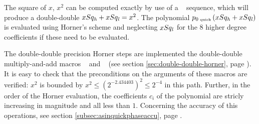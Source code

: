 The square of $x$, $x^2$ can be computed exactly by use of a \Mul~
sequence, which will produce a double-double $xSq_{\mathit{h}} + xSq_{\mathit{l}} =
x^2$. The polynomial $p_{0\mbox{\tiny ~quick}}\left( xSq_{\mathit{h}} + xSq_{\mathit{l}}
\right)$ is evaluated using Horner's scheme and neglecting $xSq_{\mathit{l}}$
for the $8$ higher degree coefficients if these need to be evaluated. 

The double-double precision Horner steps are implemented the
double-double multiply-and-add macros \MulAddDD~ and \MulAddDdD~ (see
section \ref{sec:double-double-horner}, page
\pageref{sec:double-double-horner}). It is easy to check that the
preconditions on the arguments of these macros are verified: $x^2$ is
bounded by $x^2 \leq \left(2^{-2.434403}\right)^2 \leq 2^{-4}$ in this
path. Further, in the order of the Horner evaluation, the coefficients
$c_i$ of the polynomial are stricly increasing in magnitude and all
less than $1$.  Concerning the accuracy of this operations, see
section \ref{subsec:asinquickphaseaccu}, page
\pageref{subsec:asinquickphaseaccu}.

